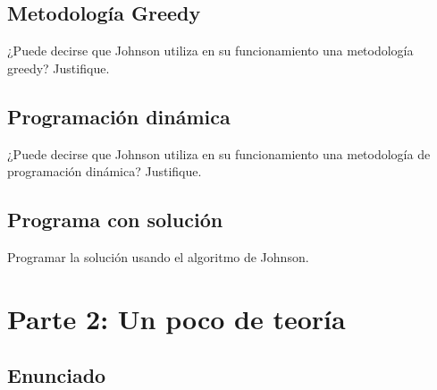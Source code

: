 \documentclass[titlepage,a4paper]{article}
\begin{document}
\newpage\subsection{Metodología Greedy}\label{sec:parte1_5}
\begin{tcolorbox}[colback=blue!5!white,colframe=blue!75!black,title=Enunciado 1.5]
    ¿Puede decirse que Johnson utiliza en su funcionamiento una metodología greedy? Justifique.
\end{tcolorbox}

\newpage\subsection{Programación dinámica}\label{sec:parte1_6}
\begin{tcolorbox}[colback=blue!5!white,colframe=blue!75!black,title=Enunciado 1.6]
    ¿Puede decirse que Johnson utiliza en su funcionamiento una metodología de programación dinámica? Justifique.
\end{tcolorbox}

\newpage\subsection{Programa con solución}\label{sec:parte1_7}
\begin{tcolorbox}[colback=blue!5!white,colframe=blue!75!black,title=Enunciado 1.7]
    Programar la solución usando el algoritmo de Johnson.
\end{tcolorbox}





\newpage\section{Parte 2: Un poco de teoría}\label{sec:parte2}

\subsection{Enunciado}
\end{document}
